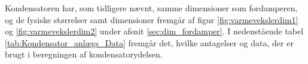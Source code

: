 \documentclass[../Hovedrapport.tex]{subfiles}
\begin{document}
Kondensatoren har, som tidligere nævnt, samme dimensioner som fordamperen, og de fysiske størrelser samt dimensioner fremgår af figur \ref{fig:varmevekslerdim1} og \ref{fig:varmevekslerdim2} under afsnit \ref{sec:dim_fordamper}. I nedenstående tabel \ref{tab:Kondensator_anlægs_Data} fremgår det, hvilke antagelser og data, der er brugt i beregningen af kondensatorydelsen.
\end{document}
